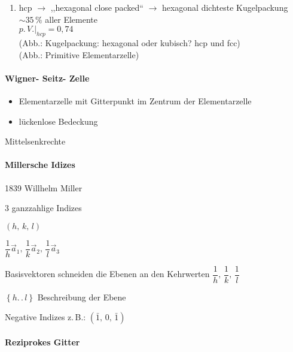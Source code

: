 \begin{enumerate}
\item hcp $\rightarrow$ ,,hexagonal close packed{}`` $\rightarrow$ hexagonal
dichteste Kugelpackung\\
$\sim35\,\%$ aller Elemente \\
$\left.p.\, V.\right|_{hcp}=0,74$ \\
(Abb.: Kugelpackung: hexagonal oder kubisch? hcp und fcc)\\
(Abb.: Primitive Elementarzelle)
\end{enumerate}

\paragraph{Wigner- Seitz- Zelle}
\begin{itemize}
\item Elementarzelle mit Gitterpunkt im Zentrum der Elementarzelle
\item lückenlose Bedeckung
\end{itemize}
Mittelsenkrechte 


\paragraph{Millersche Idizes}

1839 Willhelm Miller 

3 ganzzahlige Indizes

$\left(h,\, k,\, l\right)$

$\dfrac{1}{h}\vec{a}_{1},\,\dfrac{1}{k}\vec{a}_{2},\,\dfrac{1}{l}\vec{a}_{3}$ 

Basisvektoren schneiden die Ebenen an den Kehrwerten $\dfrac{1}{h},\,\dfrac{1}{k},\,\dfrac{1}{l}$ 

$\left\{ h.\,.\, l\right\} $ Beschreibung der Ebene 

Negative Indizes z.\,B.: $\left(\bar{1},\,0,\,\bar{1}\right)$


%
\begin{figure}


\caption{}



\end{figure}


\paragraph{Reziprokes Gitter}

